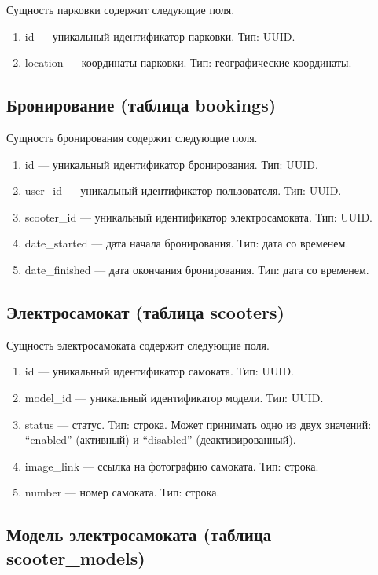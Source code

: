 Сущность парковки содержит следующие поля.

\begin{enumerate}
	\item id --- уникальный идентификатор парковки. Тип: UUID.
	\item location --- координаты парковки. Тип: географические координаты.
\end{enumerate}

\subsection{Бронирование (таблица bookings)}

Сущность бронирования содержит следующие поля.

\begin{enumerate}
	\item id --- уникальный идентификатор бронирования. Тип: UUID.
	\item user\_id --- уникальный идентификатор пользователя. Тип: UUID.
	\item scooter\_id --- уникальный идентификатор электросамоката. Тип: UUID.
	\item date\_started --- дата начала бронирования. Тип: дата со временем.
	\item date\_finished --- дата окончания бронирования. Тип: дата со временем.
\end{enumerate}

\subsection{Электросамокат (таблица scooters)}

Сущность электросамоката содержит следующие поля.

\begin{enumerate}
	\item id --- уникальный идентификатор самоката. Тип: UUID.
	\item model\_id --- уникальный идентификатор модели. Тип: UUID.
	\item status --- статус. Тип: строка. Может принимать одно из двух значений: \enquote{enabled} (активный) и \enquote{disabled} (деактивированный).
	\item image\_link --- ссылка на фотографию самоката. Тип: строка.
	\item number --- номер самоката. Тип: строка.
\end{enumerate}

\subsection{Модель электросамоката (таблица scooter\_models)}

